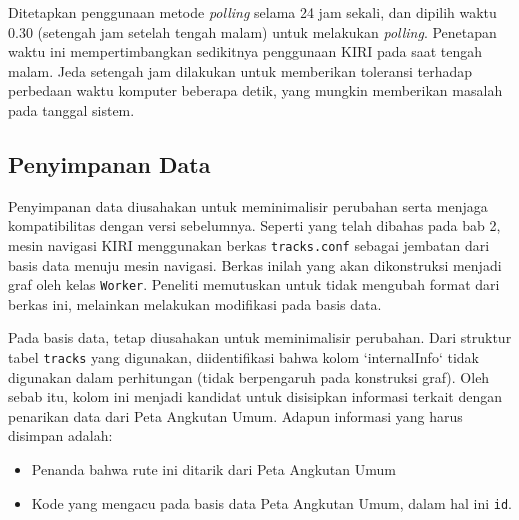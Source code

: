 Ditetapkan penggunaan metode \textit{polling} selama 24 jam sekali, dan dipilih waktu 0.30 (setengah jam setelah tengah malam) untuk melakukan \textit{polling}. Penetapan waktu ini mempertimbangkan sedikitnya penggunaan KIRI pada saat tengah malam. Jeda setengah jam dilakukan untuk memberikan toleransi terhadap perbedaan waktu komputer beberapa detik, yang mungkin memberikan masalah pada tanggal sistem. 

\subsection{Penyimpanan Data}

Penyimpanan data diusahakan untuk meminimalisir perubahan serta menjaga kompatibilitas dengan versi sebelumnya. Seperti yang telah dibahas pada bab 2, mesin navigasi KIRI menggunakan berkas \texttt{tracks.conf} sebagai jembatan dari basis data menuju mesin navigasi. Berkas inilah yang akan dikonstruksi menjadi graf oleh kelas \texttt{Worker}. Peneliti memutuskan untuk tidak mengubah format dari berkas ini, melainkan melakukan modifikasi pada basis data.

Pada basis data, tetap diusahakan untuk meminimalisir perubahan. Dari struktur tabel \texttt{tracks} yang digunakan, diidentifikasi bahwa kolom `internalInfo` tidak digunakan dalam perhitungan (tidak berpengaruh pada konstruksi graf). Oleh sebab itu, kolom ini menjadi kandidat untuk disisipkan informasi terkait dengan penarikan data dari Peta Angkutan Umum. Adapun informasi yang harus disimpan adalah:

\begin{itemize}
	\item Penanda bahwa rute ini ditarik dari Peta Angkutan Umum
	\item Kode yang mengacu pada basis data Peta Angkutan Umum, dalam hal ini \texttt{id}.
\end{itemize}


